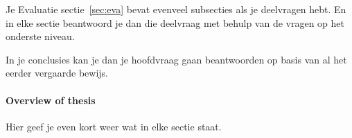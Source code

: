 Je Evaluatie sectie~\ref{sec:eva} bevat evenveel subsecties als je deelvragen hebt. En in elke sectie beantwoord je dan die deelvraag met behulp van de vragen op het onderste niveau.

In je conclusies kan je dan je hoofdvraag gaan beantwoorden op basis van al het eerder vergaarde bewijs.


\paragraph{Overview of thesis}
Hier geef je even kort weer wat in elke sectie staat.